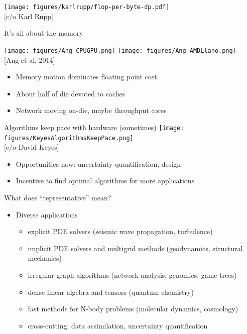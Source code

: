 \documentclass{beamer}
\begin{document}
\begin{frame}
  \texttt{[image: figures/karlrupp/flop-per-byte-dp.pdf]} \\
  {\scriptsize [c/o Karl Rupp]}
\end{frame}

\begin{frame}{It's all about the memory}
  \begin{center}
    \texttt{[image: figures/Ang-CPUGPU.png]}
    \texttt{[image: figures/Ang-AMDLlano.png]} \\
    {\scriptsize [Ang et al, 2014]}
  \end{center}
  \begin{itemize}
  \item Memory motion dominates floating point cost
  \item About half of die devoted to caches
  \item Network moving on-die, maybe throughput cores
  \end{itemize}
\end{frame}

\begin{frame}{Algorithms keep pace with hardware (sometimes)}
  \texttt{[image: figures/KeyesAlgorithmsKeepPace.png]} \\
  {\scriptsize [c/o David Keyes]}
  \begin{itemize}
  \item Opportunities now: uncertainty quantification, design
  \item Incentive to find optimal algorithms for more applications
  \end{itemize}
\end{frame}

\begin{frame}{What does ``representative'' mean?}
  \begin{itemize}
  \item Diverse applications
    \begin{itemize}
    \item explicit PDE solvers (seismic wave propagation, turbulence)
    \item implicit PDE solvers and multigrid methods (geodynamics, structural mechanics)
    \item irregular graph algorithms (network analysis, genomics, game trees) 
    \item dense linear algebra and tensors (quantum chemistry) 
    \item fast methods for N-body problems (molecular dynamics, cosmology) 
    \item cross-cutting: data assimilation, uncertainty quantification
    \end{itemize}
  \end{itemize}
\end{frame}
\end{document}
